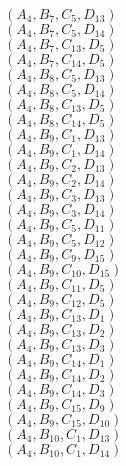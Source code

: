 \documentclass[14pt]{article}
\begin{document}
    $({A}_{4}, {B}_{7}, {C}_{5}, {D}_{13}) $ \\ 
    $({A}_{4}, {B}_{7}, {C}_{5}, {D}_{14}) $ \\ 
    $({A}_{4}, {B}_{7}, {C}_{13}, {D}_{5}) $ \\ 
    $({A}_{4}, {B}_{7}, {C}_{14}, {D}_{5}) $ \\ 
    $({A}_{4}, {B}_{8}, {C}_{5}, {D}_{13}) $ \\ 
    $({A}_{4}, {B}_{8}, {C}_{5}, {D}_{14}) $ \\ 
    $({A}_{4}, {B}_{8}, {C}_{13}, {D}_{5}) $ \\ 
    $({A}_{4}, {B}_{8}, {C}_{14}, {D}_{5}) $ \\ 
    $({A}_{4}, {B}_{9}, {C}_{1}, {D}_{13}) $ \\ 
    $({A}_{4}, {B}_{9}, {C}_{1}, {D}_{14}) $ \\ 
    $({A}_{4}, {B}_{9}, {C}_{2}, {D}_{13}) $ \\ 
    $({A}_{4}, {B}_{9}, {C}_{2}, {D}_{14}) $ \\ 
    $({A}_{4}, {B}_{9}, {C}_{3}, {D}_{13}) $ \\ 
    $({A}_{4}, {B}_{9}, {C}_{3}, {D}_{14}) $ \\ 
    $({A}_{4}, {B}_{9}, {C}_{5}, {D}_{11}) $ \\ 
    $({A}_{4}, {B}_{9}, {C}_{5}, {D}_{12}) $ \\ 
    $({A}_{4}, {B}_{9}, {C}_{9}, {D}_{15}) $ \\ 
    $({A}_{4}, {B}_{9}, {C}_{10}, {D}_{15}) $ \\ 
    $({A}_{4}, {B}_{9}, {C}_{11}, {D}_{5}) $ \\ 
    $({A}_{4}, {B}_{9}, {C}_{12}, {D}_{5}) $ \\ 
    $({A}_{4}, {B}_{9}, {C}_{13}, {D}_{1}) $ \\ 
    $({A}_{4}, {B}_{9}, {C}_{13}, {D}_{2}) $ \\ 
    $({A}_{4}, {B}_{9}, {C}_{13}, {D}_{3}) $ \\ 
    $({A}_{4}, {B}_{9}, {C}_{14}, {D}_{1}) $ \\ 
    $({A}_{4}, {B}_{9}, {C}_{14}, {D}_{2}) $ \\ 
    $({A}_{4}, {B}_{9}, {C}_{14}, {D}_{3}) $ \\ 
    $({A}_{4}, {B}_{9}, {C}_{15}, {D}_{9}) $ \\ 
    $({A}_{4}, {B}_{9}, {C}_{15}, {D}_{10}) $ \\ 
    $({A}_{4}, {B}_{10}, {C}_{1}, {D}_{13}) $ \\ 
    $({A}_{4}, {B}_{10}, {C}_{1}, {D}_{14}) $ \\ 
\end{document}
